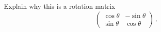 \documentclass[12pt]{amsart}
\begin{document}
\begin{question}
    Explain why this is a rotation matrix
    \begin{equation*}
        \begin{pmatrix}
            \cos \theta &  - \sin \theta \\
             \sin \theta & \cos \theta
        \end{pmatrix} \,.
    \end{equation*}
\end{question}
\end{document}
